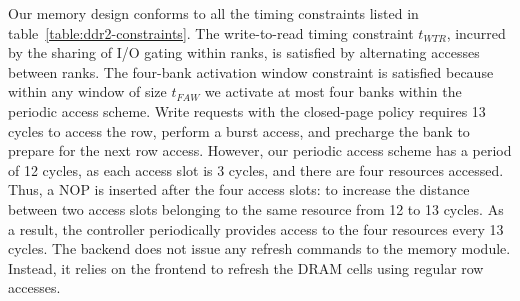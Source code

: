 Our memory design conforms to all the timing constraints listed in table~\ref{table:ddr2-constraints}.
The write-to-read timing constraint $t_{WTR}$, incurred by the sharing of I/O gating within ranks, is satisfied by alternating accesses between ranks. 
The four-bank activation window constraint is satisfied because within any window of size $t_{FAW}$ we activate at most four banks within the periodic access scheme. 
Write requests with the closed-page policy requires 13 cycles to access the row, perform a burst access, and precharge the bank to prepare for the next row access.
However, our periodic access scheme has a period of 12 cycles, as each access slot is 3 cycles, and there are four resources accessed. 
Thus, a NOP is inserted after the four access slots: to increase the distance between two access slots belonging to the same resource from 12 to 13 cycles.
As a result, the controller periodically provides access to the four resources every 13 cycles.
The backend does not issue any refresh commands to the memory module.
Instead, it relies on the frontend to refresh the DRAM cells using regular row accesses.


